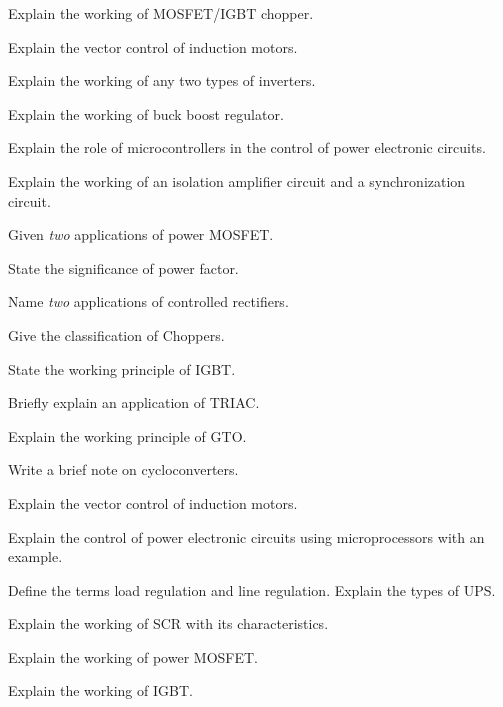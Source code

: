 \item \iitem Explain the working of MOSFET/IGBT chopper.
\item Explain the vector control of induction motors.
\ene
\Or
\item Explain the working of any two types of inverters.

\item \iitem Explain the working of buck boost regulator.
\item Explain the role of microcontrollers in the control of power
  electronic circuits.
\ene
\Or
\item Explain the working of an isolation amplifier circuit and a
  synchronization circuit.

\markC
\ene

\newpage

\sub{\subj}
\maxtime

\partA

\iitem Given {\em two} applications of power MOSFET.
\item State the significance of power factor.
\item Name {\em two} applications of controlled rectifiers.
\item Give the classification of Choppers.
\item State the working principle of IGBT.

\markA
\partB

\item Briefly explain an application of TRIAC.
\item Explain the working principle of GTO.
\item Write a brief note on cycloconverters.
\item Explain the vector control of induction motors.
\item Explain the control of power electronic circuits using microprocessors
  with an example.
\item Define the terms load regulation and line regulation. Explain the types of UPS.

\markB
\partC

\item \iitem Explain the working of SCR with its characteristics.
\Or
\item \iitem Explain the working of power MOSFET.

\newpage \again

\item Explain the working of IGBT.
\ene
\ene

